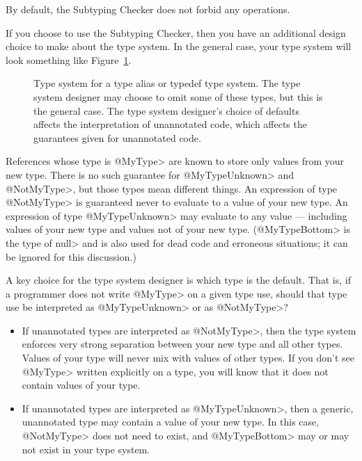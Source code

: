 By default, the Subtyping Checker does not forbid any operations.

If you choose to use the Subtyping Checker, then you have an additional
design choice to make about the type system.  In the general case, your
type system will look something like Figure~\ref{fig-typedef-hierarchy}.

\begin{figure}
\caption{Type system for a type alias or typedef type system.
  The type system designer may choose to omit some of these types, but
  this is the general case.
  The type system designer's choice of defaults affects the interpretation
  of unannotated code, which affects the guarantees given for unannotated code.
  \label{fig-typedef-hierarchy}}
\end{figure}

References whose type is \<@MyType> are known to store only values from
your new type.  There is no such guarantee for \<@MyTypeUnknown> and
\<@NotMyType>, but those types mean different things.  An expression of type
\<@NotMyType> is guaranteed never to evaluate to a value of your new type.
An expression of type \<@MyTypeUnknown> may evaluate to any value ---
including values of your new type and values not of your new type.
(\<@MyTypeBottom> is the type of \<null> and is also used for dead code and
erroneous situations; it can be ignored for this
discussion.)

A key choice for the type system designer is which type is the default.
That is, if a programmer does not write \<@MyType> on a given type use,
should that type use be interpreted as \<@MyTypeUnknown> or as
\<@NotMyType>?

\begin{itemize}
\item
If unannotated types are interpreted as \<@NotMyType>, then the type system
enforces very strong separation between your new type and all other types.
Values of your type will never mix with values of other types.  If you
don't see \<@MyType> written explicitly on a type, you will know that
it does not contain values of your type.

\item
If unannotated types are interpreted as \<@MyTypeUnknown>, then
a generic, unannotated type may contain a value of your new type.
In this case, \<@NotMyType> does not need to exist, and \<@MyTypeBottom>
may or may not exist in your type system.
\end{itemize}

